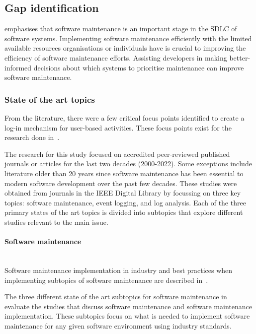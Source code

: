 \newcommand{\studyGap}{Implementing software maintenance efficiently with the limited available resources organisations or individuals have is crucial to improving the efficiency of software maintenance efforts. Assisting developers in making better-informed decisions about which systems to prioritise maintenance can improve software maintenance.}

\clearpage

\subsection{Gap identification}\label{sec:ch1_gapIdentification}
 emphasises that software maintenance is an important stage in the SDLC of software systems. \studyGap

\subsubsection{State of the art topics}
From the literature, there were a few critical focus points identified to create a log-in mechanism for user-based activities. These focus points exist for the research done in~.\par The research for this study focused on accredited peer-reviewed published journals or articles for the last two decades (2000-2022). Some exceptions include literature older than 20 years since software maintenance has been essential to modern software development over the past few decades. These studies were obtained from journals in the IEEE Digital Library by focussing on three key topics: software maintenance, event logging, and log analysis. Each of the three primary states of the art topics is divided into subtopics that explore different studies relevant to the main issue.

\paragraph{Software maintenance} \leavevmode\\
Software maintenance implementation in industry and best practices when implementing subtopics of software maintenance are described in~. \par The three different state of the art subtopics for software maintenance in~ evaluate the studies that discuss software maintenance and software maintenance implementation. These subtopics focus on what is needed to implement software maintenance for any given software environment using industry standards.

